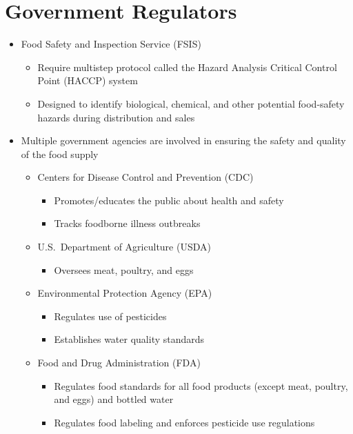 \documentclass[title={Chapter 12}]{fdsn201notes}
\begin{document}
\section{Government Regulators}\label{sec:government-regulators}
\begin{itemize}
	\item Food Safety and Inspection Service (FSIS)
	\begin{itemize}
		\item Require multistep protocol called the Hazard Analysis Critical Control Point (HACCP) system
		\item Designed to identify biological, chemical, and other potential food-safety hazards during distribution and sales
	\end{itemize}
	\item Multiple government agencies are involved in ensuring the safety and quality of the food supply
	\begin{itemize}
		\item Centers for Disease Control and Prevention (CDC)
		\begin{itemize}
			\item Promotes/educates the public about health and safety
			\item Tracks foodborne illness outbreaks
		\end{itemize}
		\item U.S.\ Department of Agriculture (USDA)
		\begin{itemize}
			\item Oversees meat, poultry, and eggs
		\end{itemize}
	\item Environmental Protection Agency (EPA)
	\begin{itemize}
		\item Regulates use of pesticides
		\item Establishes water quality standards
	\end{itemize}
	\item Food and Drug Administration (FDA)
		\begin{itemize}
			\item Regulates food standards for all food products (except meat, poultry, and eggs) and bottled water
			\item Regulates food labeling and enforces pesticide use regulations
		\end{itemize}
	\end{itemize}
\end{itemize}
\end{document}
